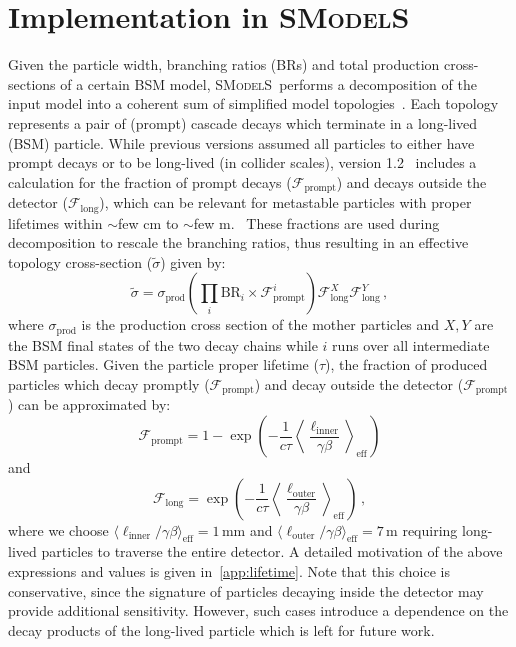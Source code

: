 \documentclass[preprint,number,sort&compress,twocolumn,3p]{elsstyarticle}
\newcommand{\smo}{\textsc{SModelS}}
\newcommand{\com}[1]{\emph{\color{red}[#1]}}  %
\begin{document}

\section{Implementation in \smo}\label{sec:impl}


Given the particle width, branching ratios (BRs) and total production cross-sections of a certain BSM model, \smo\ performs a decomposition of the input model into a coherent sum of simplified model 
topologies~\cite{Kraml:2013mwa,Ambrogi:2017neo}. 
Each topology represents a pair of (prompt) cascade decays which terminate
in a long-lived (BSM) particle. While previous versions 
assumed all particles to either have prompt decays or to be long-lived (in collider scales), version 1.2~\cite{smodlesnote} includes a calculation
for the fraction of prompt decays ($\mathcal{F}_\text{prompt}$) and decays outside the detector ($\mathcal{F}_\text{long}$), which
can be relevant for metastable particles with proper lifetimes within $\sim$few cm to $\sim$few m.~\cite{Heisig:2015yla}
These fractions are used during decomposition to 
rescale the branching ratios, thus resulting in an effective topology cross-section ($\tilde{\sigma}$) given by:
\begin{equation}
\label{eq:weights}
\tilde{\sigma} = \sigma_\text{prod}\left(\prod_i
\text{BR}_i \times \mathcal{F}_\text{prompt}^i \right)
\mathcal{F}_\text{long}^X \mathcal{F}_\text{long}^Y \,,
\end{equation}
where $\sigma_\text{prod}$ is the production cross section of the mother particles and
$X,Y$ are the BSM final states of the two decay chains while $i$ runs over all intermediate 
BSM particles. Given the particle proper lifetime ($\tau$), the fraction of produced particles which decay promptly ($\mathcal{F}_\text{prompt}$)
and decay outside the detector ($\mathcal{F}_\text{prompt}$) can be approximated by:
\begin{equation}
\mathcal{F}_\text{prompt} = 1-\exp\left(-\frac{1}{c\tau}\left\langle\!\frac{\ell_\text{inner}}{\gamma \beta} \!\right\rangle_{\!\!\text{eff}\,}\right)
\end{equation}
and
\begin{equation}
\label{eq:Flong}
\mathcal{F}_\text{long} = \exp\left(-\frac{1}{c\tau}\left\langle\!\frac{\ell_\text{outer}}{\gamma \beta} \!\right\rangle_{\!\!\text{eff}\,}\right)\,,
\end{equation}
where we choose $\langle\ell_\text{inner}/\gamma\beta\rangle_\text{eff}=1\,$mm and $\langle\ell_\text{outer}/\gamma\beta\rangle_\text{eff}=7\,$m requiring long-lived particles to traverse the entire detector. A detailed motivation of the above expressions and values is given in~\ref{app:lifetime}. Note that this choice is conservative, since the signature of particles decaying inside the detector may provide additional sensitivity. However, such cases introduce a dependence on the decay products of the long-lived particle which is left for future work.
\end{document}

